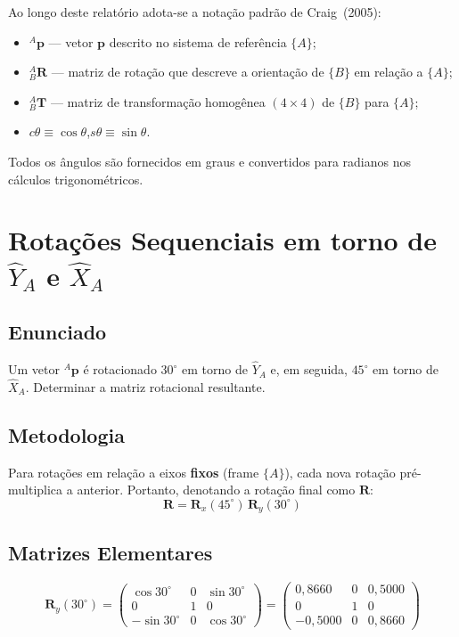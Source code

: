 \documentclass[12pt,a4paper]{article}
\newcommand{\Rx}[1]{\mathbf{R}_x(#1)}
\newcommand{\Ry}[1]{\mathbf{R}_y(#1)}
\newcommand{\degr}{^{\circ}}
\begin{document}
Ao longo deste relatório adota-se a notação padrão de Craig~(2005):

\begin{itemize}[leftmargin=2cm]
  \item ${}^{A}\mathbf{p}$ --- vetor $\mathbf{p}$ descrito no sistema de referência $\{A\}$;
  \item ${}^{A}_{B}\mathbf{R}$ --- matriz de rotação que descreve a orientação de $\{B\}$ em relação a $\{A\}$;
  \item ${}^{A}_{B}\mathbf{T}$ --- matriz de transformação homogênea $(4\times4)$ de $\{B\}$ para $\{A\}$;
  \item $c\theta \equiv \cos\theta$,\quad $s\theta \equiv \sin\theta$.
\end{itemize}

Todos os ângulos são fornecidos em graus e convertidos para radianos nos cálculos trigonométricos.

\newpage

\section{Rotações Sequenciais em torno de $\hat{Y}_A$ e $\hat{X}_A$}

\subsection*{Enunciado}
Um vetor ${}^{A}\mathbf{p}$ é rotacionado $30\degr$ em torno de $\hat{Y}_A$ e, em seguida, $45\degr$ em torno de $\hat{X}_A$.
Determinar a matriz rotacional resultante.

\subsection{Metodologia}
Para rotações em relação a eixos \textbf{fixos} (frame $\{A\}$), cada nova rotação pré-multiplica a anterior.
Portanto, denotando a rotação final como $\mathbf{R}$:
\[
  \mathbf{R} = \Rx{45\degr}\,\Ry{30\degr}
\]

\subsection{Matrizes Elementares}

\[
\Ry{30\degr} =
\begin{pmatrix}
  \cos 30\degr  & 0 & \sin 30\degr \\
  0             & 1 & 0            \\
  -\sin 30\degr & 0 & \cos 30\degr
\end{pmatrix}
=
\begin{pmatrix}
  0{,}8660  & 0 & 0{,}5000 \\
  0         & 1 & 0        \\
  -0{,}5000 & 0 & 0{,}8660
\end{pmatrix}
\]
\end{document}
